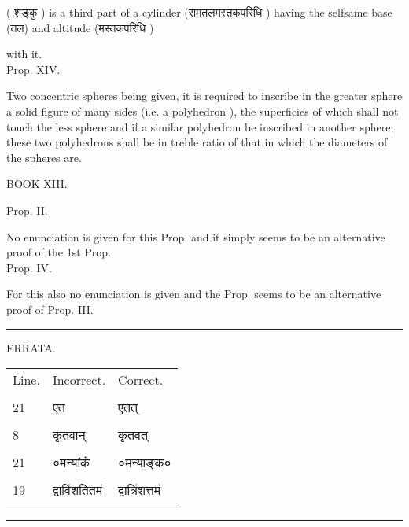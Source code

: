 \documentclass[11pt, openany]{book}
\begin{document}
\newpage 

 ( शङ्कु ) {\en is a third part of a cylinder} (समतलमस्तकपरिधि )
{\en having the selfsame base} (तल) {\en and altitude} (मस्तकपरिधि ) {\en with it.\\

\noindent Prop. XIV.

Two concentric spheres being given, it is required to inscribe in the greater sphere a solid figure of many sides (i.e. a polyhedron ), the superficies of which shall not touch the less sphere and if a similar polyhedron be inscribed in another sphere, these two polyhedrons shall
be in treble ratio of that in which the diameters of the spheres are.
\begin{center}
BOOK XIII.
\end{center}
\noindent Prop. II.

No enunciation is given for this Prop. and it simply seems to
be an alternative proof of the 1st Prop.\\

\noindent Prop. IV.

For this also no enunciation is given and the Prop. seems to
be an alternative proof of Prop. III.}

\begin{center}
\rule{0.5in}{0.3pt}
\end{center}

\newpage
\begin{center}
ERRATA.
\end{center}
\vspace{3mm}

\begin{center}
\begin{tabular}{lll}
Line. & Incorrect. & Correct.\\ \\

21  & एत & एतत्\\ \\

8 &  कृतवान्  & कृतवत्\\ \\

21 & ०मन्यांकं & ०मन्याङ्क०\\ \\

19 & द्वाविंशतितमं & द्वात्रिंशत्तमं \\ \\
\end{tabular}
\end{center}

\begin{center}
\rule{0.5in}{0.3pt}
\end{center}
\end{document}
